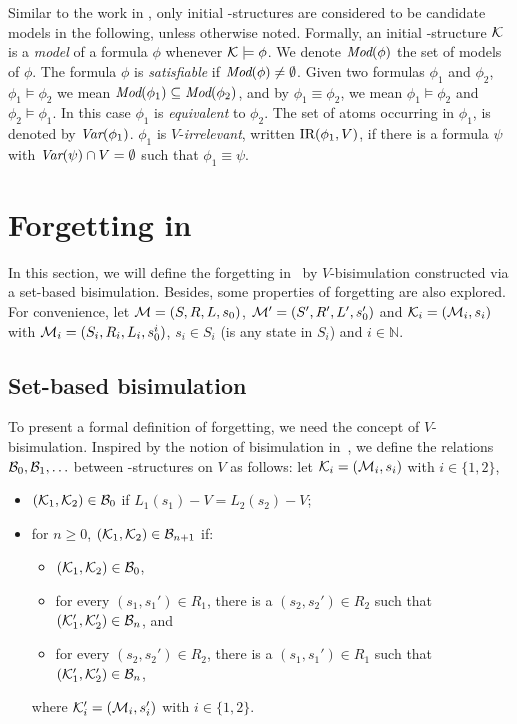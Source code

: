 \documentclass{article}
\begin{document}
Similar to the work in \cite{DBLP:journals/tcs/BrowneCG88,Bolotov:1999:JETAI},
only initial \MPK-structures are considered to be candidate models
in the following, unless otherwise noted. Formally,
an initial \MPK-structure $\cal K$ is a {\em model} of a formula $\phi$
whenever ${\cal K}\models\phi$.
We denote $\textit{Mod}(\phi)$ the set of models of $\phi$.
The formula $\phi$  is {\em satisfiable}
if $\textit{Mod}(\phi)\neq\emptyset$.
Given two formulas $\phi_1$ and $\phi_2$,  $\phi_1\models\phi_2$ we mean $\textit{Mod}(\phi_1)\subseteq\textit{Mod}(\phi_2)$, and
by $\phi_1\equiv\phi_2$, we mean $\phi_1\models\phi_2$ and $\phi_2\models\phi_1$.
In this case $\phi_1$ is {\em equivalent} to $\phi_2$.
The set of atoms occurring in $\phi_1$, is denoted by $\textit{Var}(\phi_1)$.
 $\phi_1$ is $V$-{\em irrelevant}, written $\textrm{IR}(\phi_1,V)$,
if there is a formula $\psi$ with
$\textit{Var}(\psi)\cap V=\emptyset$ such that $\phi_1\equiv\psi$.





\section{Forgetting in \CTL}
In this section, we will define the forgetting in \CTL\ by $V$-bisimulation constructed via a set-based bisimulation.
Besides, some properties of forgetting are also explored.
For convenience, let ${\cal M}=(S, R, L, s_0)$, ${\cal M}'=(S',R',L',s_0')$ and ${\cal K}_i=({\cal M}_i, s_i)$ with ${\cal M}_i=(S_i, R_i,L_i, s_0^i)$, $s_i \in S_i$ (is any state in $S_i$) and $i \in \mathbb{N}$.
\subsection{Set-based bisimulation}
To present a formal definition of forgetting, we need the concept of $V$-bisimulation.
Inspired by the notion of bisimulation in~\cite{DBLP:journals/tcs/BrowneCG88}, we define the relations ${\cal B}_0,{\cal B}_1,\ldots$
between \MPK-structures on $V$ as follows: let
${\cal K}_i=({\cal M}_i,s_i)$ with $i\in\{1,2\}$,
\begin{itemize}
  \item $({\cal K}_1,{\cal K}_2)\in{\cal B}_0$ if $L_1(s_1)- V=L_2(s_2)- V$;  %
  \item for $n\ge 0$, $({\cal K}_1,{\cal K}_2)\in{\cal B}_{n+1}$ if:
  \begin{itemize}
    \item $({\cal K}_1,{\cal K}_2)\in{\cal B}_0$,
    \item for every $(s_1,s_1')\in R_1$, there is a $(s_2,s_2')\in R_2$
    such that $({\cal K}_1',{\cal K}_2')\in {\cal B}_n$, and
    \item for every $(s_2,s_2')\in R_2$, there is a $(s_1,s_1')\in R_1$
    such that $({\cal K}_1',{\cal K}_2')\in {\cal B}_n$,
  \end{itemize}
  where ${\cal K}_i'=({\cal M}_i,s_i')$ with $i\in\{1,2\}$.
\end{itemize}
\end{document}
